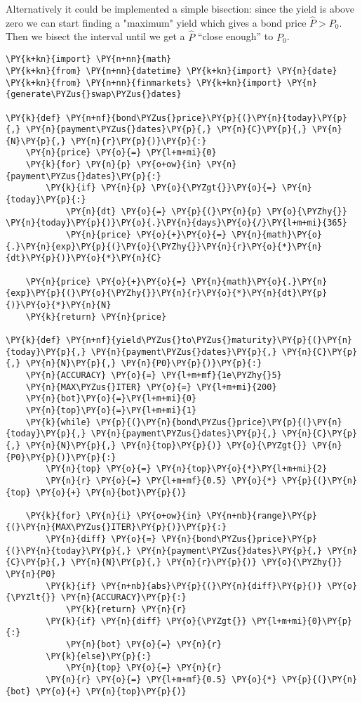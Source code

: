 Alternatively it could be implemented a simple bisection: since the yield is above zero we can start finding a "maximum" 
yield which gives a bond price $\hat{P}\gt P_0$. Then we bisect the interval until we get a $\hat{P}$ ``close enough''
to $P_0$.

\begin{codebox}
\begin{Verbatim}[commandchars=\\\{\}]
\PY{k+kn}{import} \PY{n+nn}{math}
\PY{k+kn}{from} \PY{n+nn}{datetime} \PY{k+kn}{import} \PY{n}{date}
\PY{k+kn}{from} \PY{n+nn}{finmarkets} \PY{k+kn}{import} \PY{n}{generate\PYZus{}swap\PYZus{}dates}
		
\PY{k}{def} \PY{n+nf}{bond\PYZus{}price}\PY{p}{(}\PY{n}{today}\PY{p}{,} \PY{n}{payment\PYZus{}dates}\PY{p}{,} \PY{n}{C}\PY{p}{,} \PY{n}{N}\PY{p}{,} \PY{n}{r}\PY{p}{)}\PY{p}{:}
    \PY{n}{price} \PY{o}{=} \PY{l+m+mi}{0}
    \PY{k}{for} \PY{n}{p} \PY{o+ow}{in} \PY{n}{payment\PYZus{}dates}\PY{p}{:}
        \PY{k}{if} \PY{n}{p} \PY{o}{\PYZgt{}}\PY{o}{=} \PY{n}{today}\PY{p}{:}
            \PY{n}{dt} \PY{o}{=} \PY{p}{(}\PY{n}{p} \PY{o}{\PYZhy{}} \PY{n}{today}\PY{p}{)}\PY{o}{.}\PY{n}{days}\PY{o}{/}\PY{l+m+mi}{365}
            \PY{n}{price} \PY{o}{+}\PY{o}{=} \PY{n}{math}\PY{o}{.}\PY{n}{exp}\PY{p}{(}\PY{o}{\PYZhy{}}\PY{n}{r}\PY{o}{*}\PY{n}{dt}\PY{p}{)}\PY{o}{*}\PY{n}{C}
		
    \PY{n}{price} \PY{o}{+}\PY{o}{=} \PY{n}{math}\PY{o}{.}\PY{n}{exp}\PY{p}{(}\PY{o}{\PYZhy{}}\PY{n}{r}\PY{o}{*}\PY{n}{dt}\PY{p}{)}\PY{o}{*}\PY{n}{N}
    \PY{k}{return} \PY{n}{price}
		
\PY{k}{def} \PY{n+nf}{yield\PYZus{}to\PYZus{}maturity}\PY{p}{(}\PY{n}{today}\PY{p}{,} \PY{n}{payment\PYZus{}dates}\PY{p}{,} \PY{n}{C}\PY{p}{,} \PY{n}{N}\PY{p}{,} \PY{n}{P0}\PY{p}{)}\PY{p}{:}
    \PY{n}{ACCURACY} \PY{o}{=} \PY{l+m+mf}{1e\PYZhy{}5}
    \PY{n}{MAX\PYZus{}ITER} \PY{o}{=} \PY{l+m+mi}{200}
    \PY{n}{bot}\PY{o}{=}\PY{l+m+mi}{0}
    \PY{n}{top}\PY{o}{=}\PY{l+m+mi}{1}
    \PY{k}{while} \PY{p}{(}\PY{n}{bond\PYZus{}price}\PY{p}{(}\PY{n}{today}\PY{p}{,} \PY{n}{payment\PYZus{}dates}\PY{p}{,} \PY{n}{C}\PY{p}{,} \PY{n}{N}\PY{p}{,} \PY{n}{top}\PY{p}{)} \PY{o}{\PYZgt{}} \PY{n}{P0}\PY{p}{)}\PY{p}{:}
        \PY{n}{top} \PY{o}{=} \PY{n}{top}\PY{o}{*}\PY{l+m+mi}{2}
        \PY{n}{r} \PY{o}{=} \PY{l+m+mf}{0.5} \PY{o}{*} \PY{p}{(}\PY{n}{top} \PY{o}{+} \PY{n}{bot}\PY{p}{)}
    
    \PY{k}{for} \PY{n}{i} \PY{o+ow}{in} \PY{n+nb}{range}\PY{p}{(}\PY{n}{MAX\PYZus{}ITER}\PY{p}{)}\PY{p}{:}
        \PY{n}{diff} \PY{o}{=} \PY{n}{bond\PYZus{}price}\PY{p}{(}\PY{n}{today}\PY{p}{,} \PY{n}{payment\PYZus{}dates}\PY{p}{,} \PY{n}{C}\PY{p}{,} \PY{n}{N}\PY{p}{,} \PY{n}{r}\PY{p}{)} \PY{o}{\PYZhy{}} \PY{n}{P0}
        \PY{k}{if} \PY{n+nb}{abs}\PY{p}{(}\PY{n}{diff}\PY{p}{)} \PY{o}{\PYZlt{}} \PY{n}{ACCURACY}\PY{p}{:}
            \PY{k}{return} \PY{n}{r}
        \PY{k}{if} \PY{n}{diff} \PY{o}{\PYZgt{}} \PY{l+m+mi}{0}\PY{p}{:}
            \PY{n}{bot} \PY{o}{=} \PY{n}{r}
        \PY{k}{else}\PY{p}{:}
            \PY{n}{top} \PY{o}{=} \PY{n}{r}
        \PY{n}{r} \PY{o}{=} \PY{l+m+mf}{0.5} \PY{o}{*} \PY{p}{(}\PY{n}{bot} \PY{o}{+} \PY{n}{top}\PY{p}{)}
		

\end{Verbatim}
\end{codebox}
